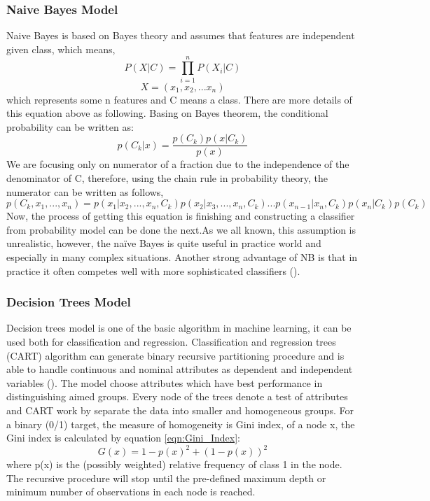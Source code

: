 \documentclass[a4paper,11pt]{article}
\begin{document}
\subsubsection{Naive Bayes Model}
Naive Bayes is based on Bayes theory and assumes that features are independent given class, which means,
\begin{equation}
P(X|C)=\prod_{i=1}^{n}P(X_{i}|C)
\end{equation}
\begin{equation}
X=\left ( x_{1},x_{2},...x_{n} \right )
\end{equation}
which represents some n features and C means a class. There are more details of this equation above as following.
Basing on Bayes theorem, the conditional probability can be written as:
\begin{equation}
p\left ( C_{k}|x \right )=\frac{p\left ( C_{k} \right )p\left ( x|C_{k} \right )}{p\left ( x \right )}
\end{equation}
We are focusing only on numerator of a fraction due to the independence of the denominator of C, therefore, using the chain rule in probability theory, the numerator can be written as follows,
\begin{equation}
p\left ( C_{k},x_{1},...,x_{n}\right )=p\left ( x_{1}|x_{2},...,x_{n},C_{k} \right )p\left ( x_{2}|x_{3},...,x_{n},C_{k} \right )...p\left ( x_{n-1}|x_{n},C_{k} \right )p\left ( x_{n}|C_{k} \right )p\left ( C_{k} \right )
\end{equation}
Now, the process of getting this equation is finishing and constructing a classifier from probability model can be done the next.As we all known, this assumption is unrealistic, however, the naïve Bayes is quite useful in practice world and especially in many complex situations. Another strong advantage of NB is that in practice it often competes well with more sophisticated classifiers (\cite{Rishnb}).

\subsubsection{Decision Trees Model}
Decision trees model is one of the basic algorithm in machine learning, it can be used both for classification and regression. Classification and regression trees (CART) algorithm can generate binary recursive partitioning procedure and is able to handle continuous and nominal attributes as dependent and independent variables (\cite{steinberg2009cart}). The model choose attributes which have best performance in distinguishing aimed groups. Every node of the trees denote a test of attributes and CART work by separate the data into smaller and homogeneous groups.  For a binary (0/1) target, the measure of homogeneity is Gini index, of a node x, the Gini index is calculated by equation \ref{eqn:Gini_Index}:
\begin{equation}
G(x)=1-p(x)^{2}+(1-p(x))^{2}
\label{eqn:Gini_Index}
\end{equation}
where p(x) is the (possibly weighted) relative frequency of class 1 in the node. The recursive procedure will stop until the pre-defined maximum depth or minimum number of observations in each node is reached.\\
\end{document}
